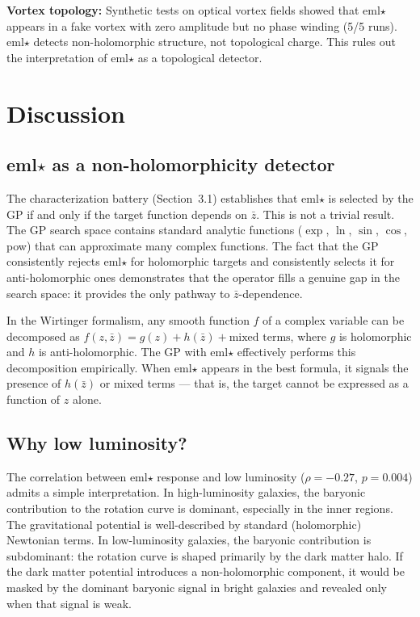\documentclass[12pt,a4paper]{article}
\begin{document}
\textbf{Vortex topology:} Synthetic tests on optical vortex fields showed that eml$\star$ appears in a fake vortex with zero amplitude but no phase winding (5/5 runs). eml$\star$ detects non-holomorphic structure, not topological charge. This rules out the interpretation of eml$\star$ as a topological detector.

\section{Discussion}

\subsection{eml$\star$ as a non-holomorphicity detector}

The characterization battery (Section~3.1) establishes that eml$\star$ is selected by the GP if and only if the target function depends on $\bar{z}$. This is not a trivial result. The GP search space contains standard analytic functions ($\exp$, $\ln$, $\sin$, $\cos$, pow) that can approximate many complex functions. The fact that the GP consistently rejects eml$\star$ for holomorphic targets and consistently selects it for anti-holomorphic ones demonstrates that the operator fills a genuine gap in the search space: it provides the only pathway to $\bar{z}$-dependence.

In the Wirtinger formalism, any smooth function $f$ of a complex variable can be decomposed as $f(z, \bar{z}) = g(z) + h(\bar{z}) + \text{mixed terms}$, where $g$ is holomorphic and $h$ is anti-holomorphic. The GP with eml$\star$ effectively performs this decomposition empirically. When eml$\star$ appears in the best formula, it signals the presence of $h(\bar{z})$ or mixed terms --- that is, the target cannot be expressed as a function of $z$ alone.

\subsection{Why low luminosity?}

The correlation between eml$\star$ response and low luminosity ($\rho = -0.27$, $p = 0.004$) admits a simple interpretation. In high-luminosity galaxies, the baryonic contribution to the rotation curve is dominant, especially in the inner regions. The gravitational potential is well-described by standard (holomorphic) Newtonian terms. In low-luminosity galaxies, the baryonic contribution is subdominant: the rotation curve is shaped primarily by the dark matter halo. If the dark matter potential introduces a non-holomorphic component, it would be masked by the dominant baryonic signal in bright galaxies and revealed only when that signal is weak.
\end{document}
